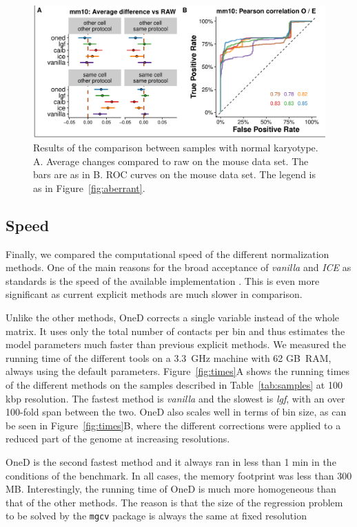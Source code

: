 \documentclass{bioinfo}
\begin{document}
\begin{figure}
\centerline{\includegraphics[width=.50\textwidth]{img/correlation_normal_figure4.pdf}}
\caption{
Results of the comparison between samples with normal karyotype.  A.
Average changes compared to raw on the mouse data set. The bars are as in
B. ROC curves on the mouse data set. The legend is as in
Figure~\ref{fig:aberrant}.}
\label{fig:normal}
\end{figure}



\subsection{Speed}

Finally, we compared the computational speed of the different
normalization methods. One of the main reasons for the broad acceptance of
\textit{vanilla} and \textit{ICE} as standards is the speed of the
available implementation \citep{imakaev2012iterative}. This is even more
significant as current explicit methods \citep{servant2012hitc} are much
slower in comparison.

Unlike the other methods, OneD corrects a single variable instead of the
whole matrix. It uses only the total number of contacts per bin and thus
estimates the model parameters much faster than previous explicit methods.
We measured the running time of the different tools on a 3.3~GHz machine
with 62 GB~RAM, always using the default parameters. Figure~\ref{fig:times}A
shows the running times of the different methods on the samples described
in Table~\ref{tab:samples} at 100 kbp resolution. The fastest method is
\textit{vanilla} and the slowest is \textit{lgf}, with an over 100-fold
span between the two. OneD also scales well in terms of bin size, as can
be seen in Figure~\ref{fig:times}B, where the different corrections were
applied to a reduced part of the genome at increasing resolutions.

OneD is the second fastest method and it always ran in less than 1 min in
the conditions of the benchmark. In all cases, the memory footprint was
less than 300 MB. Interestingly, the running time of OneD is much more
homogeneous than that of the other methods. The reason is that the size of
the regression problem to be solved by the \texttt{mgcv} package is always
the same at fixed resolution
\end{document}
